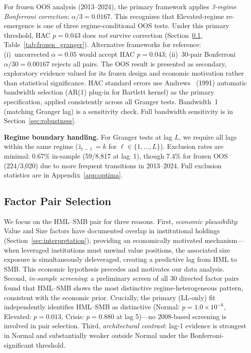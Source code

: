 \documentclass[sigconf,anonymous]{acmart}
\begin{document}
For frozen OOS analysis (2013--2024), the primary framework applies
\emph{3-regime Bonferroni correction}: $\alpha/3 = 0.0167$. This recognizes
that Elevated-regime re-emergence is one of three regime-conditional OOS tests.
Under this primary threshold, HAC $p = 0.043$ does \emph{not} survive correction
(Section~\ref{sec:pairselection}, Table~\ref{tab:frozen_granger}).
Alternative frameworks for reference: (i)~uncorrected $\alpha = 0.05$ would accept
HAC $p = 0.043$; (ii)~30-pair Bonferroni $\alpha/30 = 0.00167$ rejects all pairs.
The OOS result is presented as secondary, exploratory evidence valued for its frozen
design and economic motivation rather than statistical significance.
HAC standard errors use Andrews~\cite{andrews1991heteroskedasticity}
(1991) automatic bandwidth selection (AR(1) plug-in for Bartlett kernel) as the primary specification,
applied consistently across all Granger tests. Bandwidth~1 (matching Granger lag) is a sensitivity check. Full bandwidth sensitivity is in
Section~\ref{sec:robustness}.

\textbf{Regime boundary handling.} For Granger tests at lag $L$,
we require all lags within the same regime ($\hat{z}_{t-\ell} = k$ for
$\ell \in \{1, \ldots, L\}$). Exclusion rates are minimal: 0.67\%
in-sample (59/8,817 at lag~1), though 7.4\% for frozen OOS (224/3,020)
due to more frequent transitions in 2013--2024. Full exclusion statistics
are in Appendix~\ref{app:optima}.

\subsection{Factor Pair Selection}
\label{sec:pairselection}

We focus on the HML--SMB pair for three reasons. First, \emph{economic
plausibility}: Value and Size factors have documented overlap in institutional
holdings (Section~\ref{sec:interpretation}), providing an economically motivated
mechanism---when leveraged institutions must unwind value positions, the associated
size exposure is simultaneously deleveraged, creating a predictive lag from HML
to SMB. This economic hypothesis precedes and motivates our data analysis.
Second, \emph{in-sample screening}: a preliminary screen of all 30 directed
factor pairs found that HML--SMB shows the most distinctive regime-heterogeneous
pattern, consistent with the economic prior. Crucially, the primary (LL-only) fit
independently identifies HML--SMB as distinctive (Normal: $p = 1.0 \times 10^{-6}$,
Elevated: $p = 0.013$, Crisis: $p = 0.880$ at lag 5)---no 2008-based screening is
involved in pair selection.
Third, \emph{architectural contrast}: lag-1 evidence is strongest in Normal and
substantially weaker outside Normal under the Bonferroni-significant threshold.
\end{document}
